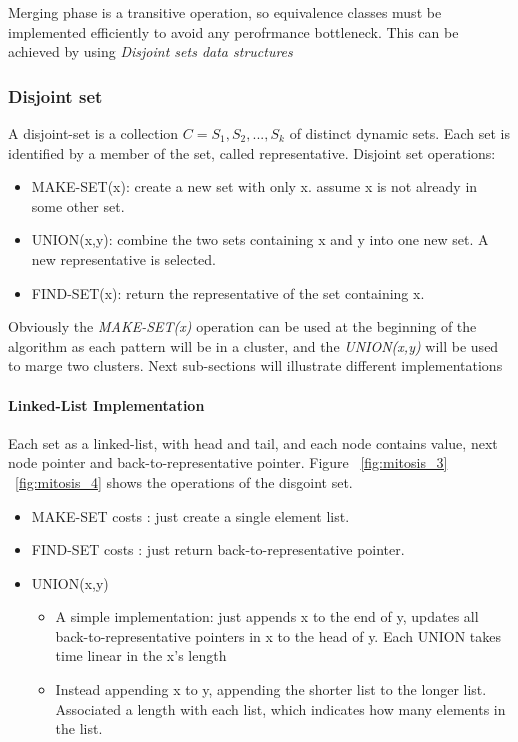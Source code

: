 Merging phase is a transitive operation, so equivalence classes must be implemented efficiently to avoid any perofrmance bottleneck.
This can be achieved by using \textit{Disjoint sets data structures}
\subsubsection{Disjoint set}

A disjoint-set is a collection $C={S_1, S_2,..., S_k}$ of distinct dynamic sets.
Each set is identified by a member of the set, called representative.
Disjoint set operations:
\begin{itemize}
\item MAKE-SET(x): create a new set with only x. assume x is not already in some other set.
\item UNION(x,y): combine the two sets containing x and y into one new set. A new representative is selected.
\item FIND-SET(x): return the representative of the set containing x.
\end{itemize}
Obviously the \textit{MAKE-SET(x)} operation can be used at the beginning of the algorithm as each pattern will be in a cluster, and the \textit{UNION(x,y)} will be used to marge two clusters.
Next sub-sections will illustrate different implementations
\paragraph{Linked-List Implementation}
Each set as a linked-list, with head and tail, and each node contains value, next node pointer and back-to-representative pointer.
Figure ~\ref{fig:mitosis_3} ~\ref{fig:mitosis_4} shows the operations of the disgoint set.
\begin{itemize}
\item MAKE-SET costs : just create a single element list.
\item FIND-SET costs : just return back-to-representative pointer.
\item {UNION(x,y) 
\begin{itemize}
\item {A simple implementation: just appends x to the end of y, updates all back-to-representative pointers in x to the head of y.
Each UNION takes time linear in the x's length}
\item {Instead appending x to y, appending the shorter list to the longer list.
Associated a length with each list, which indicates how many elements in the list.
}
\end{itemize}
}
\end{itemize}

